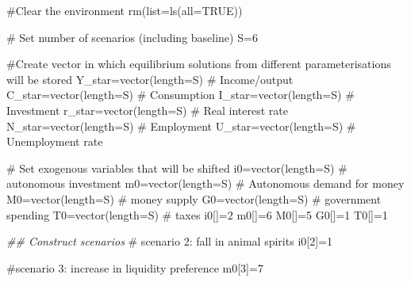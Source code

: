 \documentclass[
  letterpaper,
  DIV=11,
  numbers=noendperiod]{scrreprt}
\newenvironment{Shaded}{\begin{snugshade}}{\end{snugshade}}
\newcommand{\AttributeTok}[1]{\textcolor[rgb]{0.40,0.45,0.13}{#1}}
\newcommand{\CommentTok}[1]{\textcolor[rgb]{0.37,0.37,0.37}{#1}}
\newcommand{\ConstantTok}[1]{\textcolor[rgb]{0.56,0.35,0.01}{#1}}
\newcommand{\DecValTok}[1]{\textcolor[rgb]{0.68,0.00,0.00}{#1}}
\newcommand{\DocumentationTok}[1]{\textcolor[rgb]{0.37,0.37,0.37}{\textit{#1}}}
\newcommand{\FunctionTok}[1]{\textcolor[rgb]{0.28,0.35,0.67}{#1}}
\newcommand{\NormalTok}[1]{\textcolor[rgb]{0.00,0.23,0.31}{#1}}
\newcommand{\OtherTok}[1]{\textcolor[rgb]{0.00,0.23,0.31}{#1}}
\begin{document}
\begin{Shaded}
\begin{Highlighting}[]
\CommentTok{\#Clear the environment}
\FunctionTok{rm}\NormalTok{(}\AttributeTok{list=}\FunctionTok{ls}\NormalTok{(}\AttributeTok{all=}\ConstantTok{TRUE}\NormalTok{))}

\CommentTok{\# Set number of scenarios (including baseline)}
\NormalTok{S}\OtherTok{=}\DecValTok{6}

\CommentTok{\#Create vector in which equilibrium solutions from different parameterisations will be stored}
\NormalTok{Y\_star}\OtherTok{=}\FunctionTok{vector}\NormalTok{(}\AttributeTok{length=}\NormalTok{S) }\CommentTok{\# Income/output}
\NormalTok{C\_star}\OtherTok{=}\FunctionTok{vector}\NormalTok{(}\AttributeTok{length=}\NormalTok{S) }\CommentTok{\# Consumption}
\NormalTok{I\_star}\OtherTok{=}\FunctionTok{vector}\NormalTok{(}\AttributeTok{length=}\NormalTok{S) }\CommentTok{\# Investment}
\NormalTok{r\_star}\OtherTok{=}\FunctionTok{vector}\NormalTok{(}\AttributeTok{length=}\NormalTok{S) }\CommentTok{\# Real interest rate}
\NormalTok{N\_star}\OtherTok{=}\FunctionTok{vector}\NormalTok{(}\AttributeTok{length=}\NormalTok{S) }\CommentTok{\# Employment}
\NormalTok{U\_star}\OtherTok{=}\FunctionTok{vector}\NormalTok{(}\AttributeTok{length=}\NormalTok{S) }\CommentTok{\# Unemployment rate}

\CommentTok{\# Set exogenous variables that will be shifted}
\NormalTok{i0}\OtherTok{=}\FunctionTok{vector}\NormalTok{(}\AttributeTok{length=}\NormalTok{S) }\CommentTok{\# autonomous investment}
\NormalTok{m0}\OtherTok{=}\FunctionTok{vector}\NormalTok{(}\AttributeTok{length=}\NormalTok{S) }\CommentTok{\# Autonomous demand for money}
\NormalTok{M0}\OtherTok{=}\FunctionTok{vector}\NormalTok{(}\AttributeTok{length=}\NormalTok{S) }\CommentTok{\# money supply}
\NormalTok{G0}\OtherTok{=}\FunctionTok{vector}\NormalTok{(}\AttributeTok{length=}\NormalTok{S) }\CommentTok{\# government spending}
\NormalTok{T0}\OtherTok{=}\FunctionTok{vector}\NormalTok{(}\AttributeTok{length=}\NormalTok{S) }\CommentTok{\# taxes}
\NormalTok{i0[]}\OtherTok{=}\DecValTok{2}
\NormalTok{m0[]}\OtherTok{=}\DecValTok{6}
\NormalTok{M0[]}\OtherTok{=}\DecValTok{5}   
\NormalTok{G0[]}\OtherTok{=}\DecValTok{1}   
\NormalTok{T0[]}\OtherTok{=}\DecValTok{1}

\DocumentationTok{\#\# Construct scenarios}
\CommentTok{\# scenario 2: fall in animal spirits}
\NormalTok{i0[}\DecValTok{2}\NormalTok{]}\OtherTok{=}\DecValTok{1}
 
\CommentTok{\#scenario 3: increase in liquidity preference}
\NormalTok{m0[}\DecValTok{3}\NormalTok{]}\OtherTok{=}\DecValTok{7}


\end{Highlighting}
\end{Shaded}
\end{document}
